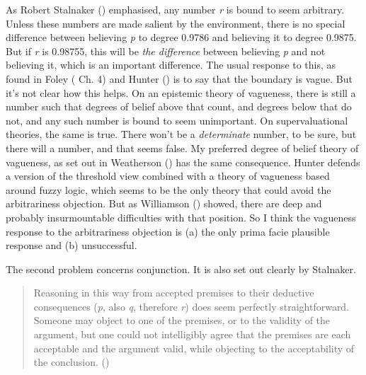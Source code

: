 \documentclass[
  10pt,
  letterpaper,
  DIV=11,
  numbers=noendperiod,
  twoside]{scrartcl}
\begin{document}
As Robert Stalnaker () emphasised,
any number \emph{r} is bound to seem arbitrary. Unless these numbers are
made salient by the environment, there is no special difference between
believing \emph{p} to degree 0.9786 and believing it to degree 0.9875.
But if \emph{r} is 0.98755, this will be \emph{the difference} between
believing \emph{p} and not believing it, which is an important
difference. The usual response to this, as found in Foley
( Ch. 4) and Hunter
() is to say that the boundary is vague.
But it's not clear how this helps. On an epistemic theory of vagueness,
there is still a number such that degrees of belief above that count,
and degrees below that do not, and any such number is bound to seem
unimportant. On supervaluational theories, the same is true. There won't
be a \emph{determinate} number, to be sure, but there will a number, and
that seems false. My preferred degree of belief theory of vagueness, as
set out in Weatherson () has
the same consequence. Hunter defends a version of the threshold view
combined with a theory of vagueness based around fuzzy logic, which
seems to be the only theory that could avoid the arbitrariness
objection. But as Williamson ()
showed, there are deep and probably insurmountable difficulties with
that position. So I think the vagueness response to the arbitrariness
objection is (a) the only prima facie plausible response and (b)
unsuccessful.

The second problem concerns conjunction. It is also set out clearly by
Stalnaker.

\begin{quote}
Reasoning in this way from accepted premises to their deductive
consequences (\emph{p}, also \emph{q}, therefore \emph{r}) does seem
perfectly straightforward. Someone may object to one of the premises, or
to the validity of the argument, but one could not intelligibly agree
that the premises are each acceptable and the argument valid, while
objecting to the acceptability of the conclusion.
()
\end{quote}
\end{document}
